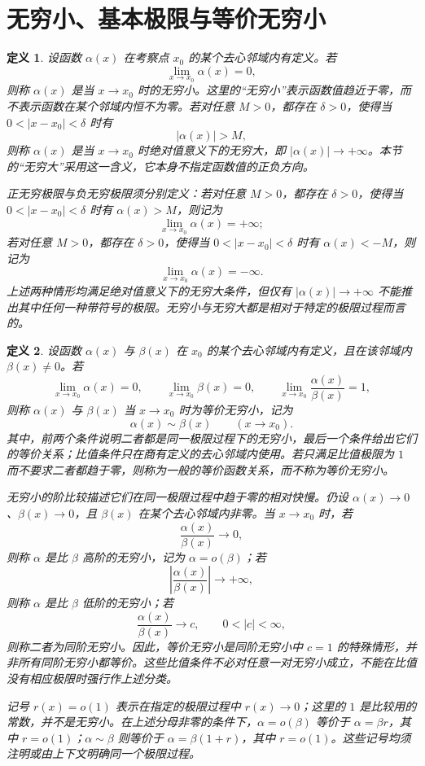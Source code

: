 \documentclass[UTF8,fontset=fandol,11pt]{ctexart}
\newtheorem{definition}{定义}[section]
\begin{document}
\section{无穷小、基本极限与等价无穷小}\label{sec:S03}
\begin{definition}
设函数 $\alpha(x)$ 在考察点 $x_0$ 的某个去心邻域内有定义。若
\[
\lim_{x\to x_0}\alpha(x)=0,
\]
则称 $\alpha(x)$ 是当 $x\to x_0$ 时的无穷小。这里的“无穷小”表示函数值趋近于零，而不表示函数在某个邻域内恒不为零。若对任意 $M>0$，都存在 $\delta>0$，使得当 $0<|x-x_0|<\delta$ 时有
\[
|\alpha(x)|>M,
\]
则称 $\alpha(x)$ 是当 $x\to x_0$ 时绝对值意义下的无穷大，即 $|\alpha(x)|\to+\infty$。本节的“无穷大”采用这一含义，它本身不指定函数值的正负方向。

正无穷极限与负无穷极限须分别定义：若对任意 $M>0$，都存在 $\delta>0$，使得当 $0<|x-x_0|<\delta$ 时有 $\alpha(x)>M$，则记为
\[
\lim_{x\to x_0}\alpha(x)=+\infty;
\]
若对任意 $M>0$，都存在 $\delta>0$，使得当 $0<|x-x_0|<\delta$ 时有 $\alpha(x)<-M$，则记为
\[
\lim_{x\to x_0}\alpha(x)=-\infty.
\]
上述两种情形均满足绝对值意义下的无穷大条件，但仅有 $|\alpha(x)|\to+\infty$ 不能推出其中任何一种带符号的极限。无穷小与无穷大都是相对于特定的极限过程而言的。\label{def:infinitesimal}
\end{definition}
\begin{definition}
设函数 $\alpha(x)$ 与 $\beta(x)$ 在 $x_0$ 的某个去心邻域内有定义，且在该邻域内 $\beta(x)\neq0$。若
\[
\lim_{x\to x_0}\alpha(x)=0,\qquad
\lim_{x\to x_0}\beta(x)=0,
\qquad
\lim_{x\to x_0}\frac{\alpha(x)}{\beta(x)}=1,
\]
则称 $\alpha(x)$ 与 $\beta(x)$ 当 $x\to x_0$ 时为等价无穷小，记为
\[
\alpha(x)\sim\beta(x)\qquad(x\to x_0).
\]
其中，前两个条件说明二者都是同一极限过程下的无穷小，最后一个条件给出它们的等价关系；比值条件只在商有定义的去心邻域内使用。若只满足比值极限为 $1$ 而不要求二者都趋于零，则称为一般的等价函数关系，而不称为等价无穷小。\label{def:equivalent-infinitesimal}

无穷小的阶比较描述它们在同一极限过程中趋于零的相对快慢。仍设 $\alpha(x)\to0$、$\beta(x)\to0$，且 $\beta(x)$ 在某个去心邻域内非零。当 $x\to x_0$ 时，若
\[
\frac{\alpha(x)}{\beta(x)}\to0,
\]
则称 $\alpha$ 是比 $\beta$ 高阶的无穷小，记为 $\alpha=o(\beta)$；若
\[
\left|\frac{\alpha(x)}{\beta(x)}\right|\to+\infty,
\]
则称 $\alpha$ 是比 $\beta$ 低阶的无穷小；若
\[
\frac{\alpha(x)}{\beta(x)}\to c,\qquad 0<|c|<\infty,
\]
则称二者为同阶无穷小。因此，等价无穷小是同阶无穷小中 $c=1$ 的特殊情形，并非所有同阶无穷小都等价。这些比值条件不必对任意一对无穷小成立，不能在比值没有相应极限时强行作上述分类。

记号 $r(x)=o(1)$ 表示在指定的极限过程中 $r(x)\to0$；这里的 $1$ 是比较用的常数，并不是无穷小。在上述分母非零的条件下，$\alpha=o(\beta)$ 等价于 $\alpha=\beta r$，其中 $r=o(1)$；$\alpha\sim\beta$ 则等价于 $\alpha=\beta(1+r)$，其中 $r=o(1)$。这些记号均须注明或由上下文明确同一个极限过程。
\end{definition}
\end{document}
